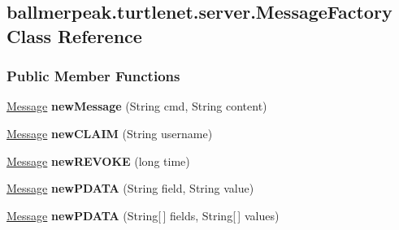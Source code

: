 \hypertarget{classballmerpeak_1_1turtlenet_1_1server_1_1MessageFactory}{\subsection{ballmerpeak.\-turtlenet.\-server.\-Message\-Factory Class Reference}
\label{classballmerpeak_1_1turtlenet_1_1server_1_1MessageFactory}
}
\subsubsection*{Public Member Functions}
\begin{DoxyCompactItemize}
\item 
\hypertarget{classballmerpeak_1_1turtlenet_1_1server_1_1MessageFactory_a7002eaa445dc787d9f48c522e3c4d38f}{\hyperlink{classballmerpeak_1_1turtlenet_1_1shared_1_1Message}{Message} {\bfseries new\-Message} (String cmd, String content)}\label{classballmerpeak_1_1turtlenet_1_1server_1_1MessageFactory_a7002eaa445dc787d9f48c522e3c4d38f}

\item 
\hypertarget{classballmerpeak_1_1turtlenet_1_1server_1_1MessageFactory_a96cb2d8fa129ec51603a53f0bffd821d}{\hyperlink{classballmerpeak_1_1turtlenet_1_1shared_1_1Message}{Message} {\bfseries new\-C\-L\-A\-I\-M} (String username)}\label{classballmerpeak_1_1turtlenet_1_1server_1_1MessageFactory_a96cb2d8fa129ec51603a53f0bffd821d}

\item 
\hypertarget{classballmerpeak_1_1turtlenet_1_1server_1_1MessageFactory_aef6d14c4ca6c13776d25fa525c1f39fc}{\hyperlink{classballmerpeak_1_1turtlenet_1_1shared_1_1Message}{Message} {\bfseries new\-R\-E\-V\-O\-K\-E} (long time)}\label{classballmerpeak_1_1turtlenet_1_1server_1_1MessageFactory_aef6d14c4ca6c13776d25fa525c1f39fc}

\item 
\hypertarget{classballmerpeak_1_1turtlenet_1_1server_1_1MessageFactory_a46db634da1ffe850a4066cae406db0cd}{\hyperlink{classballmerpeak_1_1turtlenet_1_1shared_1_1Message}{Message} {\bfseries new\-P\-D\-A\-T\-A} (String field, String value)}\label{classballmerpeak_1_1turtlenet_1_1server_1_1MessageFactory_a46db634da1ffe850a4066cae406db0cd}

\item 
\hypertarget{classballmerpeak_1_1turtlenet_1_1server_1_1MessageFactory_a1a8e1c48e4a813a743ddc65fc73616bb}{\hyperlink{classballmerpeak_1_1turtlenet_1_1shared_1_1Message}{Message} {\bfseries new\-P\-D\-A\-T\-A} (String\mbox{[}$\,$\mbox{]} fields, String\mbox{[}$\,$\mbox{]} values)}\label{classballmerpeak_1_1turtlenet_1_1server_1_1MessageFactory_a1a8e1c48e4a813a743ddc65fc73616bb}


\end{DoxyCompactItemize}
